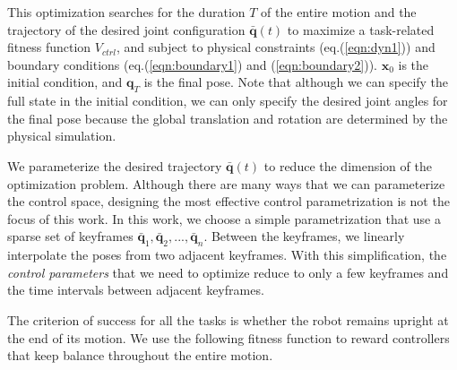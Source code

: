 This optimization searches for the duration $T$ of the entire motion and the trajectory of the desired joint configuration $\bar{\mathbf{q}}(t)$ to maximize a task-related fitness function $V_{ctrl}$, and subject to physical constraints (eq.(\ref{eqn:dyn1})) and boundary conditions (eq.(\ref{eqn:boundary1}) and (\ref{eqn:boundary2})). $\mathbf{x}_0$ is the initial condition, and $\mathbf{q}_T$ is the final pose. Note that although we can specify the full state in the initial condition, we can only specify the desired joint angles for the final pose because the global translation and rotation are determined by the physical simulation.

We parameterize the desired trajectory $\bar{\mathbf{q}}(t)$ to reduce the dimension of the optimization problem. Although there are many ways that we can parameterize the control space, designing the most effective control parametrization is not the focus of this work. In this work, we choose a simple parametrization that use a sparse set of keyframes $\bar{\mathbf{q}}_1, \bar{\mathbf{q}}_2, ..., \bar{\mathbf{q}}_n$. Between the keyframes, we linearly interpolate the poses from two adjacent keyframes. With this simplification, the \emph{control parameters} that we need to optimize reduce to only a few keyframes and the time intervals between adjacent keyframes.


The criterion of success for all the tasks is whether the robot remains upright at the end of its motion. We use the following fitness function to reward controllers that keep balance throughout the entire motion.


